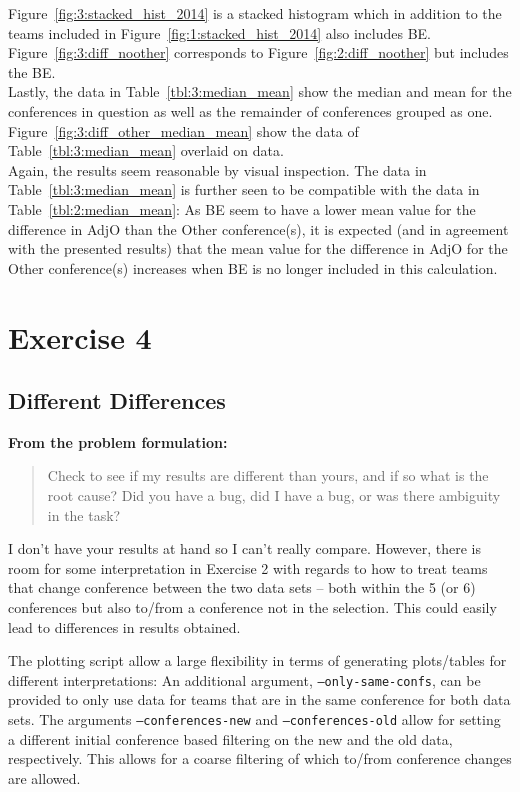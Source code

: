 \documentclass[
    12pt,
    a4paper,
    oneside, 
    headinclude,footinclude,
    BCOR5mm,
]{scrartcl}
\newcommand{\cmd}[1]{\texttt{#1}}
\newcommand{\exercisequote}[1]{%
    {\quad\bfseries \small From the problem formulation:}%
    \vspace{-.5em}%
    \begin{quote}\itshape %
        #1 %
    \end{quote}%
}
\begin{document}
Figure~\ref{fig:3:stacked_hist_2014} is a stacked histogram
which in addition to the teams included in Figure~\ref{fig:1:stacked_hist_2014}
also includes BE.\\
Figure~\ref{fig:3:diff_noother} corresponds to Figure~\ref{fig:2:diff_noother}
but includes the BE.\\
Lastly, the data in Table~\ref{tbl:3:median_mean} show the median and mean
for the conferences in question as well as the remainder of conferences grouped as one.
Figure~\ref{fig:3:diff_other_median_mean} show the data of Table~\ref{tbl:3:median_mean}
overlaid on data.\\
Again, the results seem reasonable by visual inspection. The data in Table~\ref{tbl:3:median_mean} is further seen to be compatible with the data in Table~\ref{tbl:2:median_mean}: As BE seem to have a lower mean value for the difference in AdjO than the Other conference(s), it is expected (and in agreement with the presented results) that the mean value for the difference in AdjO for the Other conference(s) increases when BE is no longer included in this calculation.

\section*{Exercise 4}
\subsection*{Different Differences}
\exercisequote{
    Check to see if my results are different than yours, and if so what is
    the root cause? Did you have a bug, did I have a bug, or was there
    ambiguity in the task?
}
I don't have your results at hand so I can't really compare.
However, there is room for some interpretation in Exercise 2
with regards to how to treat teams that change conference
between the two data sets 
-- both within the 5 (or 6) conferences
but also to/from a conference not in the selection.
This could easily lead to differences in results obtained.

The plotting script allow a large flexibility in terms of
generating plots/tables for different interpretations:
An additional argument, \cmd{--only-same-confs}, can be provided
to only use data for teams that are in the same conference
for both data sets.
The arguments \cmd{--conferences-new} and \cmd{--conferences-old}
allow for setting a different initial conference based filtering
on the new and the old data, respectively.
This allows for a coarse filtering of which to/from conference 
changes are allowed.
\end{document}

